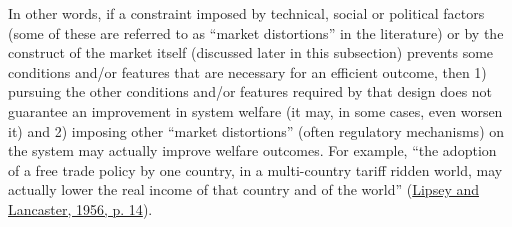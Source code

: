\documentclass[12pt,a4paper,]{report}
\begin{document}
In other words, if a constraint imposed by technical, social or
political factors (some of these are referred to as ``market
distortions'' in the literature) or by the construct of the market
itself (discussed later in this subsection) prevents some conditions
and/or features that are necessary for an efficient outcome, then 1)
pursuing the other conditions and/or features required by that design
does not guarantee an improvement in system welfare (it may, in some
cases, even worsen it) and 2) imposing other ``market distortions''
(often regulatory mechanisms) on the system may actually improve welfare
outcomes. For example, ``the adoption of a free trade policy by one
country, in a multi-country tariff ridden world, may actually lower the
real income of that country and of the world''
(\protect\hyperlink{ref-lipseyGeneralTheorySecond1956}{Lipsey and
Lancaster, 1956, p. 14}).
\end{document}
